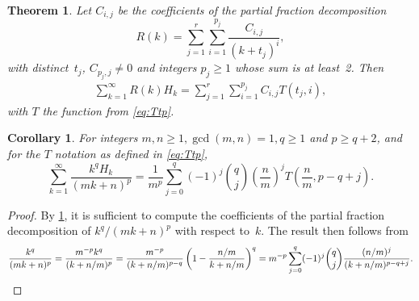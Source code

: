 \documentclass[10pt,a4paper]{amsart}
\newtheorem{theorem}{Theorem}
\newtheorem{corollary}{Corollary}
\begin{document}
\begin{theorem} \label{thm:thm3}
Let $C_{i,j}$ be the coefficients of the partial fraction decomposition
\begin{equation}
R(k) = \sum_{j=1}^r\sum_{i=1}^{p_j}\frac{C_{i,j}}{(k+t_j)^i},
\end{equation}
with distinct~$t_j$, $C_{p_j,j}\neq0$ and integers $p_j \geq
1$ whose sum is at least~2. Then
\begin{align}
\sum_{k=1}^\infty R(k){H_k}=\sum_{j=1}^r\sum_{i=1}^{p_j}C_{i,j}T(t_j,i),
\label{form:theorem4a}
\end{align}
with $T$ the function from \cref{eq:Ttp}.
\end{theorem}

\begin{corollary} \label{cor:cor2}
For integers $m, n \geq 1, \gcd (m, n) = 1, q \geq 1$ and $p \geq q+2$, and for the $T$ notation as defined in \cref{eq:Ttp},
\[\sum_{k=1}^\infty \frac{k^q H_k}{(mk+n)^p} =\frac1{m^p} \sum_
{j=0}^q 
(-1)^j
\binom{q}{j} \left(\frac nm\right)^j T \left(\frac nm,p-q+j\right).\]
\end{corollary}

\begin{proof} By \cref{thm:thm3}, it is sufficient to compute the
coefficients of the partial fraction decomposition of $k^q/(mk+n)^p$
with respect to~$k$. The result then follows from
\[\frac{k^q}{(mk+n)^p}=\frac{m^{-p}k^q}{(k+n/m)^p}=\frac{m^{-p}}{(k+n/m)^
{p-q}}\left (1- \frac{n/m}
{k+n/m}\right)^q=m^{-p}\sum_{j=0}^q (-1)^j \binom{q}{j} \frac{(n/m)^j}
{
(k+n/m)^
{p-q+j}}.\qedhere\]
\end{proof}
\end{document}
